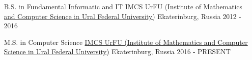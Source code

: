 


\begin{cventries}


\cventry
{B.S. in Fundamental Informatic and IT}
{\href{https://urfu.ru/en/}{IMCS UrFU \newline (Institute of Mathematics and Computer Science in Ural Federal University)}}
{Ekaterinburg, Russia}
{2012 - 2016}
{ %
}

\cventry
{M.S. in Computer Science}
{\href{https://urfu.ru/en/}{IMCS UrFU \newline (Institute of Mathematics and Computer Science in Ural Federal University)}}
{Ekaterinburg, Russia}
{2016 - PRESENT}
{ %
}


\end{cventries}